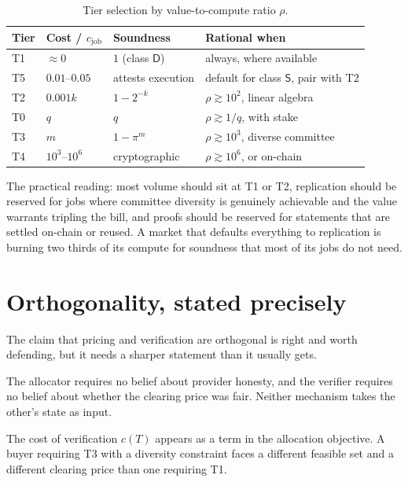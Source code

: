 \documentclass[11pt,a4paper]{article}
\begin{document}
\begin{table}[h]
\centering
\begin{tabular}{llll}
\toprule
Tier & Cost / $c_{\text{job}}$ & Soundness & Rational when \\
\midrule
T1 & $\approx 0$          & $1$ (class $\mathsf{D}$) & always, where available \\
T5 & $0.01$--$0.05$        & attests execution & default for class $\mathsf{S}$, pair with T2 \\
T2 & $0.001k$             & $1 - 2^{-k}$ & $\rho \gtrsim 10^{2}$, linear algebra \\
T0 & $q$                  & $q$ & $\rho \gtrsim 1/q$, with stake \\
T3 & $m$                  & $1 - \pi^{m}$ & $\rho \gtrsim 10^{3}$, diverse committee \\
T4 & $10^{3}$--$10^{6}$   & cryptographic & $\rho \gtrsim 10^{6}$, or on-chain \\
\bottomrule
\end{tabular}
\caption{Tier selection by value-to-compute ratio $\rho$.}
\end{table}

The practical reading: most volume should sit at T1 or T2, replication should be
reserved for jobs where committee diversity is genuinely achievable and the value
warrants tripling the bill, and proofs
should be reserved for statements that are settled on-chain or reused. A market
that defaults everything to replication is burning two thirds of its compute for
soundness that most of its jobs do not need.

\section{Orthogonality, stated precisely}

The claim that pricing and verification are orthogonal is right and worth
defending, but it needs a sharper statement than it usually gets.

\begin{proposition}
The allocator requires no belief about provider honesty, and the verifier
requires no belief about whether the clearing price was fair. Neither mechanism
takes the other's state as input.
\end{proposition}

\begin{proposition}
The cost of verification $c(T)$ appears as a term in the allocation objective.
A buyer requiring T3 with a diversity constraint faces a different feasible set
and a different clearing price than one requiring T1.
\end{proposition}
\end{document}
